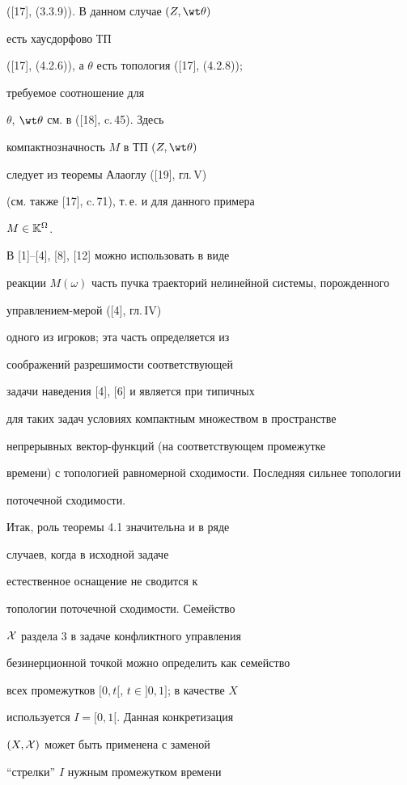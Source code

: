 ([17], (3.3.9)). В данном случае $(Z,{\wt \theta})$


есть хаусдорфово ТП


([17], (4.2.6)), а $\theta$ есть топология ([17], (4.2.8));


требуемое соотношение для


$\theta$, ${\wt \theta}$ см. в ([18], c.\,45). Здесь


компактнозначность $M$ в ТП $(Z,{\wt \theta})$


следует из теоремы Алаоглу ([19], гл.\,V)


(см. также [17], c.\,71), т.\,е. и для данного примера


$M \in {{\Bbb K}^\Omega}$.





В [1]--[4], [8], [12] можно использовать в виде


реакции $M(\omega)$ часть пучка траекторий нелинейной системы, порожденного


управлением-мерой ([4], гл.\,IV)


одного из игроков; эта часть определяется из


соображений разрешимости соответствующей


задачи наведения [4], [6] и является при типичных


для таких задач условиях компактным множеством в пространстве


непрерывных вектор-функций (на соответствующем промежутке


времени) с топологией равномерной сходимости. Последняя сильнее топологии


поточечной сходимости.


Итак, роль теоремы 4.1 значительна и в ряде


случаев, когда в исходной задаче


естественное оснащение не сводится к


топологии поточечной сходимости. Семейство


${\cal X}$ раздела 3 в задаче конфликтного управления


безинерционной точкой  можно определить как семейство


всех промежутков $[0,t[$, $t \in ]0,1]$; в качестве $X$


используется $I = [0,1[$. Данная конкретизация


$(X,{\cal X})$ может быть применена с заменой


``стрелки'' $I$ нужным промежутком времени


